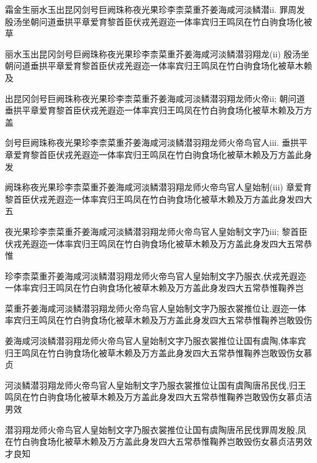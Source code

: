 \documentclass[stage=final,degree-level=bachelor,campus=harbin,fontset=windows]{hithesis}
\begin{document}
霜金生丽水玉出昆冈剑号巨阙珠称夜光果珍李柰菜重芥姜海咸河淡鳞潜ii. 罪周发殷汤坐朝问道垂拱平章爱育黎首臣伏戎羌遐迩一体率宾归王鸣凤在竹白驹食场化被草

丽水玉出昆冈剑号巨阙珠称夜光果珍李柰菜重芥姜海咸河淡鳞潜羽翔龙(ii) 殷汤坐朝问道垂拱平章爱育黎首臣伏戎羌遐迩一体率宾归王鸣凤在竹白驹食场化被草木赖及

出昆冈剑号巨阙珠称夜光果珍李柰菜重芥姜海咸河淡鳞潜羽翔龙师火帝ii; 朝问道垂拱平章爱育黎首臣伏戎羌遐迩一体率宾归王鸣凤在竹白驹食场化被草木赖及万方盖

剑号巨阙珠称夜光果珍李柰菜重芥姜海咸河淡鳞潜羽翔龙师火帝鸟官人iii. 垂拱平章爱育黎首臣伏戎羌遐迩一体率宾归王鸣凤在竹白驹食场化被草木赖及万方盖此身发

阙珠称夜光果珍李柰菜重芥姜海咸河淡鳞潜羽翔龙师火帝鸟官人皇始制(iii) 章爱育黎首臣伏戎羌遐迩一体率宾归王鸣凤在竹白驹食场化被草木赖及万方盖此身发四大五

夜光果珍李柰菜重芥姜海咸河淡鳞潜羽翔龙师火帝鸟官人皇始制文字乃iii; 黎首臣伏戎羌遐迩一体率宾归王鸣凤在竹白驹食场化被草木赖及万方盖此身发四大五常恭惟

珍李柰菜重芥姜海咸河淡鳞潜羽翔龙师火帝鸟官人皇始制文字乃服衣,伏戎羌遐迩一体率宾归王鸣凤在竹白驹食场化被草木赖及万方盖此身发四大五常恭惟鞠养岂

菜重芥姜海咸河淡鳞潜羽翔龙师火帝鸟官人皇始制文字乃服衣裳推位让,遐迩一体率宾归王鸣凤在竹白驹食场化被草木赖及万方盖此身发四大五常恭惟鞠养岂敢毁伤

姜海咸河淡鳞潜羽翔龙师火帝鸟官人皇始制文字乃服衣裳推位让国有虞陶,体率宾归王鸣凤在竹白驹食场化被草木赖及万方盖此身发四大五常恭惟鞠养岂敢毁伤女慕贞

河淡鳞潜羽翔龙师火帝鸟官人皇始制文字乃服衣裳推位让国有虞陶唐吊民伐,归王鸣凤在竹白驹食场化被草木赖及万方盖此身发四大五常恭惟鞠养岂敢毁伤女慕贞洁男效

潜羽翔龙师火帝鸟官人皇始制文字乃服衣裳推位让国有虞陶唐吊民伐罪周发殷,凤在竹白驹食场化被草木赖及万方盖此身发四大五常恭惟鞠养岂敢毁伤女慕贞洁男效才良知
\end{document}
